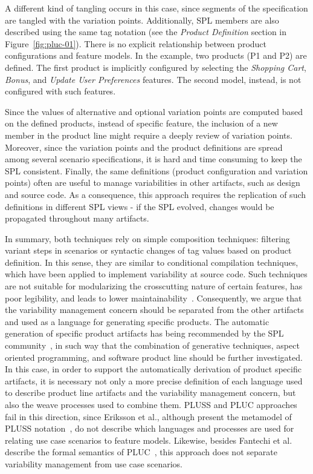 \documentclass{acm_proc_article-sp}
\begin{document}
A different kind of tangling occurs in this case, since segments of the specification are tangled with the variation 
points. Additionally, SPL members are also described using the same tag notation (see the \emph{Product Definition} section 
in Figure~\ref{fig:pluc-01}). There is no explicit relationship between product configurations and feature models. In the example, 
two products (P1 and P2) are defined. The first product is implicitly configured by selecting the \emph{Shopping Cart}, 
\emph{Bonus}, and \emph{Update User Preferences} features. The second model, instead, is not configured 
with such features. 

Since the values of alternative and optional variation points are computed based on the defined products, instead 
of specific feature, the inclusion of a new member in the product line might require a deeply review of 
variation points. Moreover, since the variation points and the product definitions are spread among several scenario specifications, it is hard and time consuming to keep the SPL consistent. Finally, the same definitions (product configuration and variation points) often are useful to manage variabilities in other artifacts, such as design and source code. As a consequence, this approach requires the replication of such definitions in different SPL views - if the SPL evolved, changes would be propagated throughout many artifacts.

In summary, both techniques rely on simple composition techniques: filtering variant steps in scenarios or syntactic changes of tag values based on product definition. In this sense, they are similar to conditional compilation techniques, which have been applied to implement variability at source code. Such techniques are not suitable for modularizing the crosscutting nature of certain features, has poor legibility, and leads to lower maintainability~\cite{alves-gpce-06}. 
Consequently, we argue that the variability management concern should be separated from the other artifacts and used as a language for generating specific products. The automatic generation of specific product artifacts has being recommended by the SPL community~\cite{krueger-cacm-200712,greenfield-softwarefactories,czarnecki-book}, in such way that the combination of generative techniques, aspect oriented programming, and software product line should be further investigated. In this case, in order to support the automatically derivation of product specific artifacts, it is necessary not only a more precise definition of each language used to describe product line artifacts and the variability management concern, but also the weave processes used to combine them. PLUSS and PLUC approaches fail in this direction, since Eriksson et al., although present the metamodel of PLUSS notation~\cite{eriksson-splc-2005}, do not describe which languages and processes are used for relating use case scenarios to feature models. Likewise, besides Fantechi et al. describe the formal semantics of PLUC~\cite{fantechi-splc-2004}, this approach does not separate variability management from use case scenarios.
\end{document}
